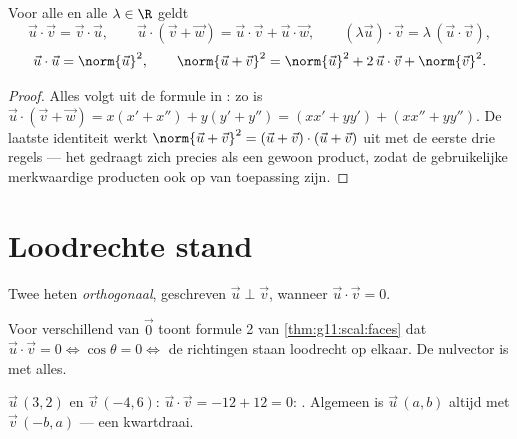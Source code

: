 \begin{proposition}[Rekenregels]\label{prop:g11:scal:rules}
Voor alle  en alle $\lambda \in \R$ geldt
\[
\vec u \cdot \vec v = \vec v \cdot \vec u, \qquad
\vec u \cdot (\vec v + \vec w) = \vec u \cdot \vec v + \vec u \cdot
\vec w, \qquad
(\lambda \vec u)\cdot \vec v = \lambda\,(\vec u \cdot \vec v),
\]
\[
\vec u \cdot \vec u = \norm{\vec u}^2,
\qquad
\norm{\vec u + \vec v}^2 = \norm{\vec u}^2 + 2\,\vec u\cdot\vec v +
\norm{\vec v}^2 .
\]
\end{proposition}

\begin{proof}
Alles volgt uit de formule in : zo is
$\vec u \cdot (\vec v + \vec w) = x(x' + x'') + y(y' + y'') =
(xx' + yy') + (xx'' + yy'')$. De laatste identiteit werkt
$\norm{\vec u + \vec v}^2 = (\vec u + \vec v)\cdot(\vec u + \vec v)$ uit met
de eerste drie regels --- het  gedraagt zich precies als een
gewoon product, zodat de gebruikelijke merkwaardige producten ook op
 van toepassing zijn.
\end{proof}

\section{Loodrechte stand}

\begin{definition}\label{def:g11:scal:orthogonal}
Twee  heten \emph{orthogonaal},
geschreven $\vec u \perp \vec v$, wanneer $\vec u \cdot \vec v = 0$.
\end{definition}

\begin{remark}
Voor  verschillend van $\vec 0$ toont formule 2 van
\cref{thm:g11:scal:faces} dat $\vec u \cdot \vec v = 0 \iff \cos\theta = 0
\iff$ de richtingen staan loodrecht op elkaar. De nulvector is 
met alles.
\end{remark}

\begin{example}
$\vec u\,(3, 2)$ en $\vec v\,(-4, 6)$: $\vec u \cdot \vec v = -12 + 12 = 0$:
. Algemeen is $\vec u\,(a, b)$ altijd  met
$\vec v\,(-b, a)$ --- een kwartdraai.
\end{example}

